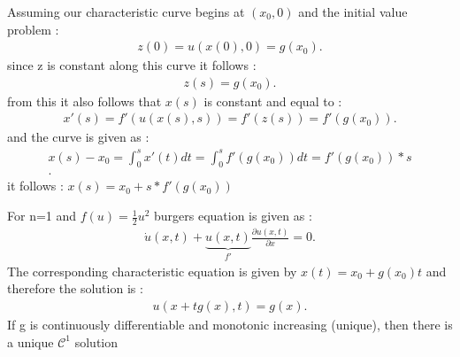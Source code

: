 Assuming our characteristic curve begins at $(x_0,0)$ and the initial value problem : 
\begin{align*}
  z(0) = u(x(0),0) = g(x_0)
.\end{align*}
since z is constant along this curve it follows : 
\begin{align*}
  z(s) = g(x_0)
.\end{align*}
from this it also follows that $x(s)$ is constant and equal to : 
\begin{align*}
  x'(s) = f'(u(x(s),s)) = f'(z(s)) = f'(g(x_0))
.\end{align*}
and the curve is given as : 
\begin{align*}
  x(s) -x_0 = \int_0^s x'(t) dt = \int_0^s f'(g(x_0)) dt = f'(g(x_0)) * s\\
.\end{align*}
it follows : $x(s) = x_0+s*f'(g(x_0))$\\[1ex]
\begin{comment}[Crossing characteristics] 
  Looking at all curves and picking two, determined by initial points $x_1,x_2\in \mathbb{R}^n$ such that the initial values are different $g(x_1) \neq  g(x_2)$
  if the curves associated with this initial value problem cross then the solution to the PDEs IVP is not unique, the above method implies :
  \begin{align*}
    g(x_1) = u(x_1+tf'(g(x_1)),t) = u(x_2+t f'(g(x_2)),t) = g(x_2)
  .\end{align*}
  which is impossible. When two curves intersect the solution cannot be uniquely determined at those points as it is ambiguous which value the point takes on.
\end{comment}
\begin{example}
For n=1 and $f(u)=\frac{1}{2}u^2$ burgers equation is given as : 
\begin{align*}
  \dot{u}(x,t) + \underbrace{u(x,t)}_{f'}\frac{\partial u(x,t)}{\partial x}  = 0
.\end{align*}
The corresponding characteristic equation is given by $x(t) = x_0 + g(x_0)t$ and therefore the solution is : 
\begin{align*}
  u(x+tg(x),t)=g(x)
.\end{align*}
If g is continuously differentiable and monotonic increasing (unique), then there is a unique $\mathcal{C}^1 $ solution
\end{example}
\begin{comment}
 Burgers equation has no solution if either $g$ is not continuously differentiable, or monotonic increasing. 
\end{comment}
\newpage
